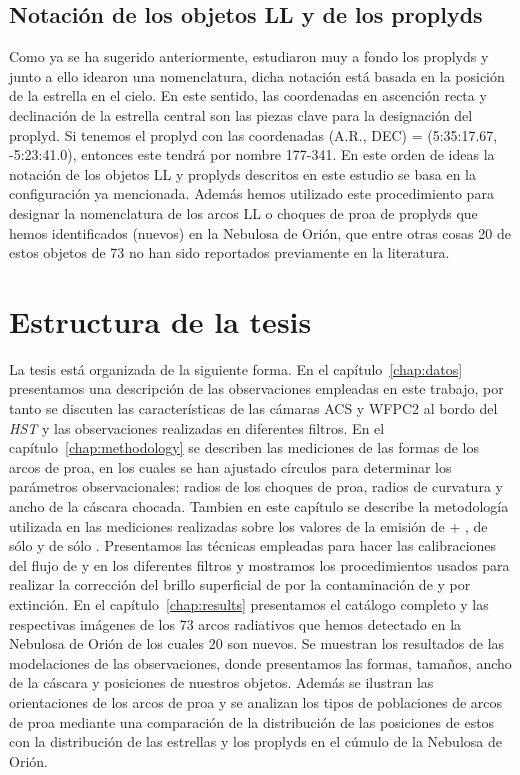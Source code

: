 \subsection{Notación de los objetos LL y de los proplyds}
\label{sec:notacion}

Como ya se ha sugerido anteriormente, \citet{Odell:1994} estudiaron muy a fondo los proplyds y junto a ello idearon una nomenclatura, dicha notación está basada en la posición de la estrella en el cielo. En este sentido, las coordenadas en ascención recta y declinación de la estrella central son las piezas clave para la designación del proplyd. Si tenemos el proplyd con las coordenadas (A.R., DEC) = (5:35:17.67, -5:23:41.0), entonces este tendrá por nombre 177-341. En este orden de ideas la notación de los objetos LL y proplyds descritos en este estudio se basa en la configuración ya mencionada. Además hemos utilizado este procedimiento para designar la nomenclatura de los arcos LL o choques de proa de proplyds que hemos identificados (nuevos) en la Nebulosa de Orión, que entre otras cosas 20 de estos objetos de 73 no han sido reportados previamente en la literatura.

\section{Estructura de la tesis}
\label{sec:estructura}

La tesis está organizada de la siguiente forma. En el capítulo~\ref{chap:datos} presentamos una descripción de las observaciones empleadas en este trabajo, por tanto se discuten las características de las cámaras ACS y WFPC2 al bordo del \textit{HST} y las observaciones realizadas en diferentes filtros. En el capítulo~\ref{chap:methodology} se describen las mediciones de las formas de los arcos de proa, en los cuales se han ajustado círculos para determinar los parámetros observacionales: radios de los choques de proa, radios de curvatura y ancho de la cáscara chocada. Tambien en este capítulo se describe la metodología utilizada en las mediciones realizadas sobre los valores de la emisión de \ha{} + \nii{}, de sólo \ha{} y de sólo \nii{}. Presentamos las técnicas empleadas para hacer las calibraciones del flujo de \ha{} y \nii{} en los diferentes filtros y mostramos los procedimientos usados para realizar la corrección del brillo superficial de \ha{} por la contaminación de \nii{} y por extinción. En el capítulo~\ref{chap:results} presentamos el catálogo completo y las respectivas imágenes de los 73 arcos radiativos que hemos detectado en la Nebulosa de Orión de los cuales 20 son nuevos. Se muestran los resultados de las modelaciones de las observaciones, donde  presentamos las formas, tamaños, ancho de la cáscara y posiciones de nuestros objetos. Además se ilustran las orientaciones de los arcos de proa y se analizan los tipos de poblaciones de arcos de proa mediante una comparación de la distribución de las posiciones de estos con la distribución de las estrellas y los proplyds en el cúmulo de la Nebulosa de Orión.\\

